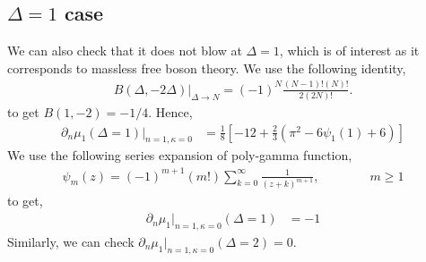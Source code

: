 \documentclass[11pt]{article}
\newcommand{\p}{\partial}
\newcommand{\lb}{\left(}
\newcommand{\rb}{\right)}
\begin{document}
\subsection{\texorpdfstring{$\Delta = 1$ case} {Delta = 1 case}}
We can also check that it does not blow at $\Delta = 1$, which is of interest as it corresponds to massless free boson theory. 
We use the following identity,
\begin{align}
    B(\Delta, -2\Delta)\Big|_{\Delta \to N} = (-1)^N \frac{(N-1)! (N)!}{2(2N)!}.
\end{align}
to get $B(1,-2) = -1/4$. Hence,
\begin{align}
    \p_n \mu_1 (\Delta = 1) \big|_{n=1, \kappa = 0} &= \frac{1}{8} \left[ -12 + \frac{2}{3}\lb \pi^2 -6\psi_1(1) + 6 \rb \right] 
\end{align}
We use the following series expansion of poly-gamma function,
\begin{align}
    \psi_m(z) = (-1)^{m+1} (m!) \sum_{k=0}^\infty \frac{1}{(z+k)^{m+1}}, \qquad \qquad m\geq 1
\end{align}
to get, 
\begin{align}
    \p_n \mu_1  \big|_{n=1, \kappa = 0} (\Delta = 1)&= -1
\end{align}
Similarly, we can check $\p_n \mu_1 \big|_{n=1, \kappa = 0}(\Delta = 2)  = 0$. 
\end{document}
